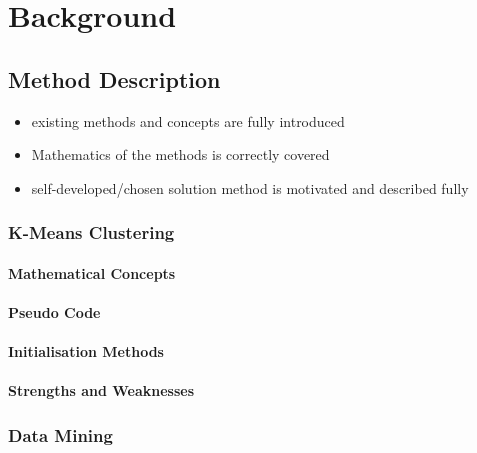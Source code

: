 \chapter{Background}
\label{cha:background}

\section{Method Description}
\label{sec:method_description}
\begin{itemize}
    \item existing methods and concepts are fully introduced
    \item Mathematics of the methods is correctly covered
    \item self-developed/chosen solution method is motivated and described fully
\end{itemize}

\subsection{K-Means Clustering}
\subsubsection*{Mathematical Concepts}
\subsubsection*{Pseudo Code}
\subsubsection*{Initialisation Methods}
\subsubsection*{Strengths and Weaknesses}

\subsection{Data Mining}